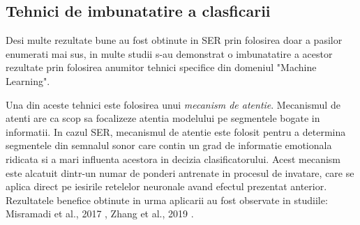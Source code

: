 \documentclass[a4paper,12pt]{book}
\begin{document}
					\subsection{Tehnici de imbunatatire a clasficarii} \label{tehnici}
						Desi multe rezultate bune au fost obtinute in SER prin folosirea doar a pasilor enumerati mai sus, in multe studii s-au demonstrat o imbunatatire a acestor rezultate prin folosirea anumitor tehnici specifice din domeniul "Machine Learning". \par
						Una din aceste tehnici este folosirea unui \textit{mecanism de atentie}. Mecanismul de atenti are ca scop sa focalizeze atentia modelului pe segmentele bogate in informatii. In cazul SER, mecanismul de atentie este folosit pentru a determina segmentele din semnalul sonor care contin un grad de informatie emotionala ridicata si a mari influenta acestora in decizia clasificatorului. Acest mecanism este alcatuit dintr-un numar de ponderi antrenate in procesul de invatare, care se aplica direct pe iesirile retelelor neuronale avand efectul prezentat anterior.  Rezultatele benefice obtinute in urma aplicarii au fost observate in studiile: Misramadi et al., 2017 \cite{misramadi}, Zhang et al., 2019 \cite{zhang} . \par
						
\end{document}
